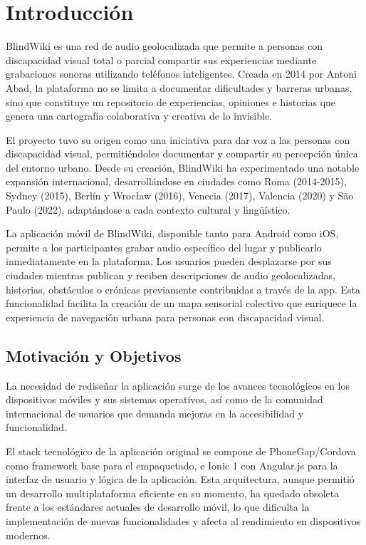 \section{Introducción}

BlindWiki es una red de audio geolocalizada que permite a personas con discapacidad visual total o parcial compartir sus experiencias mediante grabaciones sonoras utilizando teléfonos inteligentes. Creada en 2014 por Antoni Abad, la plataforma no se limita a documentar dificultades y barreras urbanas, sino que constituye un repositorio de experiencias, opiniones e historias que genera una cartografía colaborativa y creativa de lo invisible.

El proyecto tuvo su origen como una iniciativa para dar voz a las personas con discapacidad visual, permitiéndoles documentar y compartir su percepción única del entorno urbano. Desde su creación, BlindWiki ha experimentado una notable expansión internacional, desarrollándose en ciudades como Roma (2014-2015), Sydney (2015), Berlín y Wrocław (2016), Venecia (2017), Valencia (2020) y São Paulo (2022), adaptándose a cada contexto cultural y lingüístico.

La aplicación móvil de BlindWiki, disponible tanto para Android como iOS, permite a los participantes grabar audio específico del lugar y publicarlo inmediatamente en la plataforma. Los usuarios pueden desplazarse por sus ciudades mientras publican y reciben descripciones de audio geolocalizadas, historias, obstáculos o crónicas previamente contribuidas a través de la app. Esta funcionalidad facilita la creación de un mapa sensorial colectivo que enriquece la experiencia de navegación urbana para personas con discapacidad visual.

\subsection{Motivación y Objetivos}

La necesidad de rediseñar la aplicación surge de los avances tecnológicos en los dispositivos móviles y sus sistemas operativos, así como de la comunidad internacional de usuarios que demanda mejoras en la accesibilidad y funcionalidad.

El stack tecnológico de la aplicación original se compone de PhoneGap/Cordova como framework base para el empaquetado, e Ionic 1 con Angular.js para la interfaz de usuario y lógica de la aplicación. Esta arquitectura, aunque permitió un desarrollo multiplataforma eficiente en su momento, ha quedado obsoleta frente a los estándares actuales de desarrollo móvil, lo que dificulta la implementación de nuevas funcionalidades y afecta al rendimiento en dispositivos modernos.

